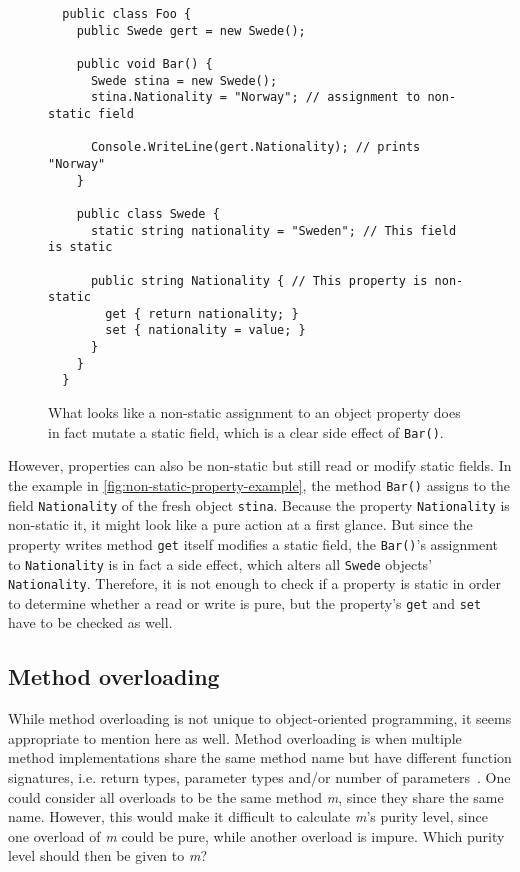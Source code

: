\documentclass[a4paper,12pt]{article}
\begin{document}
\begin{figure}
  \centering
  \begin{lstlisting}
  public class Foo {
    public Swede gert = new Swede();

    public void Bar() {
      Swede stina = new Swede();
      stina.Nationality = "Norway"; // assignment to non-static field

      Console.WriteLine(gert.Nationality); // prints "Norway"
    }

    public class Swede {
      static string nationality = "Sweden"; // This field is static

      public string Nationality { // This property is non-static
        get { return nationality; }
        set { nationality = value; }
      }
    }
  }
  \end{lstlisting}
  \caption{What looks like a non-static assignment to an object property does in fact mutate a static field, which is a clear side effect of \texttt{Bar()}.}
  \label{fig:non-static-property-example}
\end{figure}

However, properties can also be non-static but still read or modify static fields. In the example in \autoref{fig:non-static-property-example}, the method \texttt{Bar()} assigns to the field \texttt{Nationality} of the fresh object \texttt{stina}. Because the property \texttt{Nationality} is non-static it, it might look like a pure action at a first glance. But since the property writes method \texttt{get} itself modifies a static field, the \texttt{Bar()}'s assignment to \texttt{Nationality} is in fact a side effect, which alters all \texttt{Swede} objects' \texttt{Nationality}. Therefore, it is not enough to check if a property is static in order to determine whether a read or write is pure, but the property's \texttt{get} and \texttt{set} have to be checked as well.


\subsection{Method overloading} \label{sub:Method-overloading}

While method overloading is not unique to object-oriented programming, it seems appropriate to mention here as well. Method overloading is when multiple method implementations share the same method name but have different function signatures, i.e. return types, parameter types and/or number of parameters~\cite{albahari2003nutshell}. One could consider all overloads to be the same method \textit{m}, since they share the same name. However, this would make it difficult to calculate \textit{m}'s purity level, since one overload of \textit{m} could be pure, while another overload is impure. Which purity level should then be given to \textit{m}?
\end{document}
